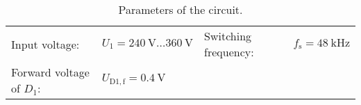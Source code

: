 
\begin{table}[ht]
    \centering  %
    \begin{tabular}{llll}
        \toprule
        Input voltage: &  $U_{\mathrm{1}} = \SI{240}{\volt}\ldots\SI{360}{\volt}$ & Switching frequency: & $f_{\mathrm{s}} = \SI{48}{\kilo\hertz}$\\ 
        Forward voltage of $D_{\mathrm{1}}$: & $U_{\mathrm{D1,f}} = \SI{0.4}{\volt}$  &  & \\ 
        \bottomrule
    \end{tabular}
    \caption{Parameters of the circuit.}  %
    \label{table:Ex04_Parameters of the singled ended forward converter.}
\end{table}